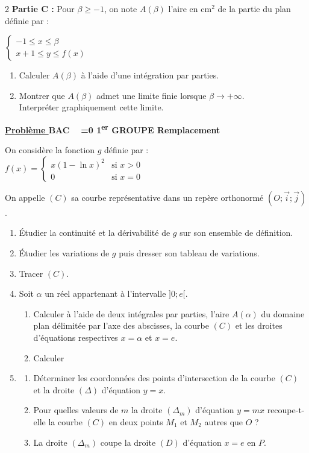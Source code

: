 \documentclass[12pt,a4paper]{article}
\newcounter{probleme}
\newcounter{annee}
\newcounter{session}
\newcommand{\exo}{%
    \refstepcounter{probleme}%
    \par\medskip
    \noindent\textbf{\underline{Problème \theprobleme}\quad
    BAC \theannee\ %
    \ifnum\value{session}=0
        1\textsuperscript{er} GROUPE%
        \setcounter{session}{1}%
    \else
        Remplacement%
        \setcounter{session}{0}%
        \stepcounter{annee}%
    \fi
    }
    \par\medskip
}
\begin{document}
\begin{multicols}{2}
\textbf{Partie C :} Pour \( \beta \geq -1 \), on note \( A(\beta) \) l’aire en \( \text{cm}^2 \) de la partie du plan définie par :

\(
\left\{
\begin{array}{l}
-1 \leq x \leq \beta \\
x + 1 \leq y \leq f(x)
\end{array}
\right.
\)

\begin{enumerate}
    \item Calculer \( A(\beta) \) à l’aide d’une intégration par parties.
    \item Montrer que \( A(\beta) \) admet une limite finie lorsque \( \beta \to +\infty \).\\
    Interpréter graphiquement cette limite.
\end{enumerate}

\exo

On considère la fonction \( g \) définie par :\\
\(
f(x) =
\begin{cases}
x(1 - \ln x)^2 & \text{si } x > 0 \\
0 & \text{si } x = 0
\end{cases}
\)

On appelle \( (C) \) sa courbe représentative dans un repère orthonormé \( (O ; \vec{i} ; \vec{j}) \).

\begin{enumerate}
    \item Étudier la continuité et la dérivabilité de \( g \) sur son ensemble de définition.
    \item Étudier les variations de \( g \) puis dresser son tableau de variations.
    \item Tracer \( (C) \).
    \item Soit \( \alpha \) un réel appartenant à l’intervalle \( ]0 ; e[ \).
    \begin{enumerate}
        \item Calculer à l’aide de deux intégrales par parties, l’aire \( A(\alpha) \) du domaine plan délimitée par l’axe des abscisses, la courbe \( (C) \) et les droites d’équations respectives \( x = \alpha \) et \( x = e \).
        \item Calculer
    \end{enumerate}
    \item
    \begin{enumerate}
        \item Déterminer les coordonnées des points d’intersection de la courbe \( (C) \) et la droite \( (\Delta) \) d’équation \( y = x \).
        \item Pour quelles valeurs de \( m \) la droite \( (\Delta_m) \) d’équation \( y = mx \) recoupe-t-elle la courbe \( (C) \) en deux points \( M_1 \) et \( M_2 \) autres que \( O \) ?
        \item La droite \( (\Delta_m) \) coupe la droite \( (D) \) d’équation \( x = e \) en \( P \). 
        

\end{enumerate}
\end{enumerate}
\end{multicols}
\end{document}

